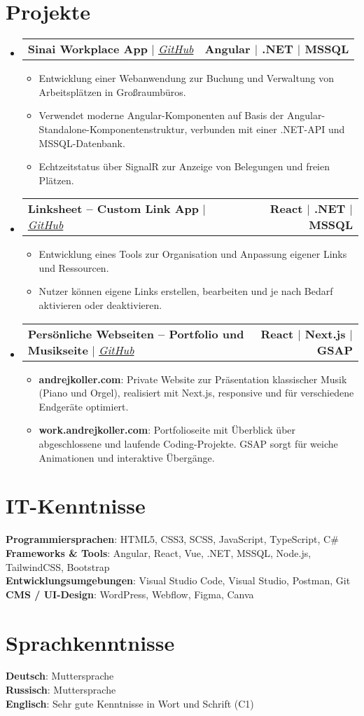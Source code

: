 \documentclass[letterpaper,11pt]{article}
\makeatletter
\newcommand{\resumeItem}[1]{
  \item\small{
    {#1 \vspace{0pt}}
  }
}
\newcommand{\resumeProjectHeading}[2]{
  \item
  \begin{tabular*}{1.001\textwidth}{l@{\extracolsep{\fill}}r}
    \small#1 & \textbf{\small #2} \\
  \end{tabular*}\vspace{-7pt}
}
\newcommand{\resumeSubHeadingListStart}{\begin{itemize}[leftmargin=0.0in, label={}]}
\newcommand{\resumeSubHeadingListEnd}{\end{itemize}\vspace{0pt}}
\newcommand{\resumeItemListStart}{\begin{itemize}}
\newcommand{\resumeItemListEnd}{\end{itemize}\vspace{-5pt}}
\makeatother
\begin{document}
\section{Projekte}
\resumeSubHeadingListStart

  \resumeProjectHeading{\textbf{Sinai Workplace App} $|$ \emph{\href{https://github.com/andrejkoller}{GitHub}}}{Angular $|$ .NET $|$ MSSQL}
  \resumeItemListStart
    \resumeItem{Entwicklung einer Webanwendung zur Buchung und Verwaltung von Arbeitsplätzen in Großraumbüros.}
    \resumeItem{Verwendet moderne Angular-Komponenten auf Basis der Angular-Standalone-Komponentenstruktur, verbunden mit einer .NET-API und MSSQL-Datenbank.}
    \resumeItem{Echtzeitstatus über SignalR zur Anzeige von Belegungen und freien Plätzen.}
  \resumeItemListEnd

  \resumeProjectHeading{\textbf{Linksheet – Custom Link App} $|$ \emph{\href{https://github.com/andrejkoller}{GitHub}}}{React $|$ .NET $|$ MSSQL}
  \resumeItemListStart
    \resumeItem{Entwicklung eines Tools zur Organisation und Anpassung eigener Links und Ressourcen.}
    \resumeItem{Nutzer können eigene Links erstellen, bearbeiten und je nach Bedarf aktivieren oder deaktivieren.}
  \resumeItemListEnd

  \resumeProjectHeading{\textbf{Persönliche Webseiten – Portfolio und Musikseite}  $|$ \emph{\href{https://github.com/andrejkoller}{GitHub}}}{React $|$ Next.js $|$ GSAP}
  \resumeItemListStart
    \resumeItem{\textbf{andrejkoller.com}: Private Website zur Präsentation klassischer Musik (Piano und Orgel), realisiert mit Next.js, responsive und für verschiedene Endgeräte optimiert.}
    \resumeItem{\textbf{work.andrejkoller.com}: Portfolioseite mit Überblick über abgeschlossene und laufende Coding-Projekte. GSAP sorgt für weiche Animationen und interaktive Übergänge.}
  \resumeItemListEnd

\resumeSubHeadingListEnd

\section{IT-Kenntnisse}
\begin{itemize}[leftmargin=0.15in, label={}]\small{\item{
  \textbf{Programmiersprachen}{: HTML5, CSS3, SCSS, JavaScript, TypeScript, C\#} \\[1mm]
  \textbf{Frameworks \& Tools}{: Angular, React, Vue, .NET, MSSQL, Node.js, TailwindCSS, Bootstrap} \\[1mm]
  \textbf{Entwicklungsumgebungen}{: Visual Studio Code, Visual Studio, Postman, Git} \\[1mm]
  \textbf{CMS / UI-Design}{: WordPress, Webflow, Figma, Canva}
}}\end{itemize}

\section{Sprachkenntnisse}
\begin{itemize}[leftmargin=0.15in, label={}]\small{\item{
  \textbf{Deutsch}{: Muttersprache} \\[1mm]
  \textbf{Russisch}{: Muttersprache} \\[1mm]
  \textbf{Englisch}{: Sehr gute Kenntnisse in Wort und Schrift (C1)} \\[1mm]
}}\end{itemize}
\end{document}
